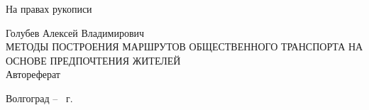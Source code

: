 \documentclass[a4paper, 14pt]{extreport}
\begin{document}
    \begin{titlepage}
        \hspace{20em}На правах рукописи\\
        \begin{center}
            \vspace{8em}Голубев Алексей Владимирович\\
            \large\vspace{6em}\MakeUppercase{Методы построения маршрутов общественного 
                транспорта на основе предпочтения жителей}\normalsize\\
            \vspace{10em}
            \large\vspace{4em}Автореферат\normalsize\\
        \end{center}
        \vfill
        \begin{center}
            Волгоград -- \the\year\ г.
        \end{center}
    \end{titlepage}
    \newpage
    \onehalfspacing
    
\end{document}
